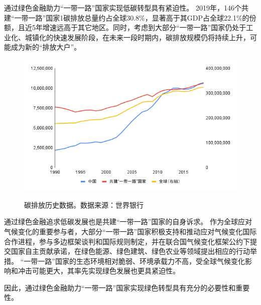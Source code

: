 \documentclass[a4paper,12pt]{ctexart}
\begin{document}
通过绿色金融助力“一带一路”国家实现低碳转型具有紧迫性。
2019年，146个共建“一带一路”国家1碳排放总量约占全球30.8\%，显著高于其GDP占全球22.1\%的份额，且近5年增速远高于其它地区。同时，考虑到大部分“一带一路”国家仍处于工业化、城镇化的快速发展阶段，在未来一段时期内，碳排放规模仍将持续上升，可能成为新的“排放大户”。
\begin{figure}[H]
    \centering
    \includegraphics[width=0.8\linewidth]{./img/碳排放-折线图.png}
    \label{fig:carbonemit2}
    \caption{碳排放历史数据。数据来源：世界银行}
\end{figure}

通过绿色金融追求低碳发展也是共建“一带一路”国家的自身诉求。
作为全球应对气候变化的重要参与者，大部分“一带一路”国家积极支持和推动应对气候变化国际合作进程，参与多边框架谈判和国际规则制定，并在联合国气候变化框架公约下提交国家自主贡献承诺，在绿色能源、绿色建筑、绿色农业等领域提出相应的行动举措。
“一带一路”国家的生态环境相对脆弱、环境承载力不高，受全球气候变化影响和冲击可能更大，其率先实现绿色发展也更具紧迫性。

因此，通过绿色金融助力“一带一路”国家实现绿色转型具有充分的必要性和重要性。
\end{document}
